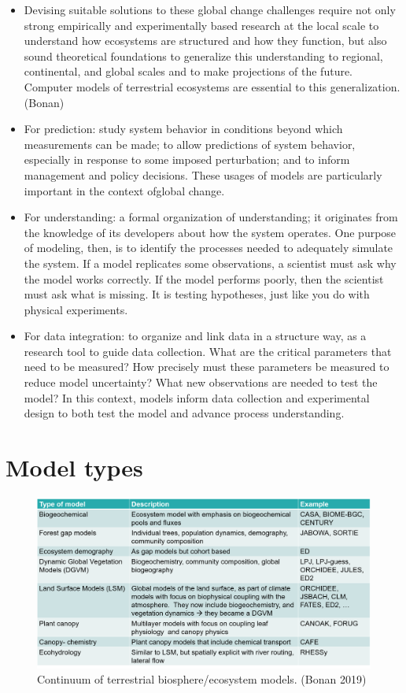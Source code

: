 \documentclass[
  oneside]{book}
\providecommand{\tightlist}{%
  \setlength{\itemsep}{0pt}\setlength{\parskip}{0pt}}
\begin{document}
\begin{itemize}
\tightlist
\item
  Devising suitable solutions to these global change challenges require not only strong empirically and experimentally based research at the local scale to understand how ecosystems are structured and how they function, but also sound theoretical foundations to generalize this understanding to regional, continental, and global scales and to make projections of the future. Computer models of terrestrial ecosystems are essential to this generalization. (Bonan)
\item
  For prediction: study system behavior in conditions beyond which measurements can be made; to allow predictions of system behavior, especially in response to some imposed perturbation; and to inform management and policy decisions. These usages of models are particularly important in the context ofglobal change.
\item
  For understanding: a formal organization of understanding; it originates from the knowledge of its developers about how the system operates. One purpose of modeling, then, is to identify the processes needed to adequately simulate the system. If a model replicates some observations, a scientist must ask why the model works correctly. If the model performs poorly, then the scientist
  must ask what is missing. It is testing hypotheses, just like you do with physical experiments.
\item
  For data integration: to organize and link data in a structure way, as a research tool to guide data collection. What are the critical parameters that need to be measured? How precisely must these parameters be measured to reduce model uncertainty? What new observations are needed to test the model? In this context, models inform data collection and experimental design to both test the model and advance process understanding.
\end{itemize}

\hypertarget{model-types}{%
\section{Model types}\label{model-types}}

\begin{figure}

{\centering \includegraphics[width=0.8\linewidth]{figures/chap1/table_model_types} 

}

\caption{Continuum of terrestrial biosphere/ecosystem models. (Bonan 2019)}\label{fig:f5}
\end{figure}
\end{document}
